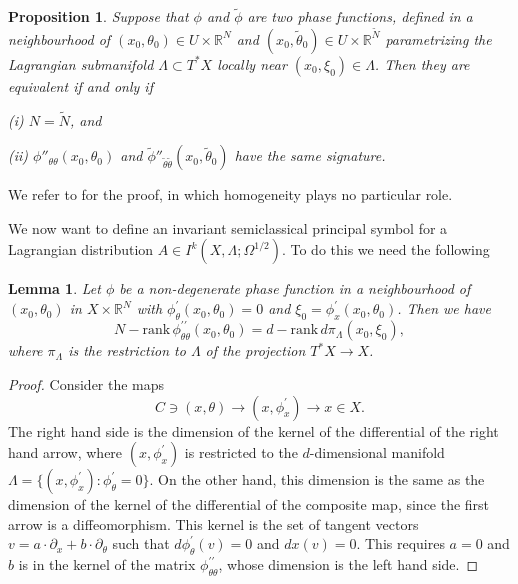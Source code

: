 \documentclass[10pt, a4paper, twoside]{amsart}
\numberwithin{equation}{section}
\newtheorem{lemma}[theorem]{Lemma}
\newtheorem{proposition}[theorem]{Proposition}
\theoremstyle{remark}
\begin{document}
\begin{appendix}
	\begin{proposition}\label{prop:equivalence}
	Suppose that $\phi$ and $\tilde \phi$ are two phase functions, defined in a neighbourhood of $(x_0, \theta_0) \in U \times {\mathbb{R}}^N$ and $(x_0, \tilde\theta_0) \in U \times {\mathbb{R}}^{\tilde N}$ parametrizing the Lagrangian submanifold $\Lambda \subset T^* X$ locally near $(x_0, \xi_0) \in \Lambda$. Then they are equivalent if and only if
	
	(i) $N = \tilde N$, and
	
	(ii) $\phi''_{\theta \theta}(x_0, \theta_0)$ and $\tilde \phi''_{\tilde \theta \tilde \theta}(x_0, \tilde \theta_0)$ have the same signature.
	\end{proposition}
	
	We refer to \cite[Section 3.1]{Hormander-Acta-1971} for the proof, in which homogeneity plays no particular role. 
	
	We now want to define an invariant semiclassical principal symbol for a Lagrangian distribution $A \in I^k(X, \Lambda; \Omega^{1/2})$. To do this we need the following 
	
	\begin{lemma}\label{lem:Nrank}
	Let $\phi$ be a non-degenerate phase function in a neighbourhood of $(x_0, \theta_0)$ in $X \times \mathbb{R}^N$ with $\phi^\prime_\theta (x_0, \theta_0) = 0$ and $\xi_0 = \phi^\prime_x(x_0, \theta_0)$. Then we have $$N - \text{rank}\, \phi^{\prime\prime}_{\theta\theta}(x_0, \theta_0) = d - \text{rank}\, d\pi_\Lambda(x_0, \xi_0),$$ where $\pi_\Lambda$ is the restriction to $\Lambda$ of the projection $T^\ast X \rightarrow X$.
	\end{lemma}
	
	\begin{proof} Consider the maps 
	$$C \ni (x, \theta) \longrightarrow (x, \phi^\prime_x) \longrightarrow x \in X.$$
	The right hand side is the dimension of the kernel of the differential of the right hand arrow, where $(x, \phi^\prime_x)$ is  restricted to the $d$-dimensional manifold $\Lambda = \{(x, \phi^\prime_x) : \phi^\prime_\theta = 0\}$. On the other hand, this dimension is the same as the dimension of the kernel of the differential of the composite map, since the first arrow is a diffeomorphism. This kernel is 
	 the set of tangent vectors $v = a \cdot \partial_x + b \cdot \partial_\theta$ such that $ d\phi^\prime_\theta(v) = 0$ and $dx(v) = 0$. This requires $a = 0$ and $b$ is in the kernel of  the matrix $\phi^{\prime\prime}_{\theta\theta}$, whose dimension is the left hand side.
	\end{proof}
	

\end{appendix}
\end{document}
